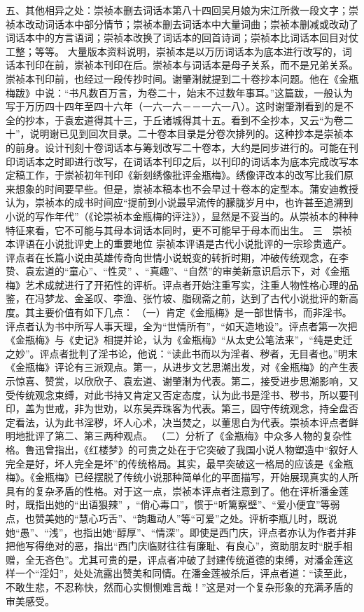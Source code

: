 \documentclass[a4paper,12pt,UTF8,twoside]{ctexbook}
\begin{document}
五、其他相异之处：崇祯本删去词话本第八十四回吴月娘为宋江所救一段文字；崇祯本改动词话本中部分情节；崇祯本删去词话本中大量词曲；崇祯本删减或改动了词话本中的方言语词；崇祯本改换了词话本的回首诗词；崇祯本比词话本回目对仗工整；等等。
大量版本资料说明，崇祯本是以万历词话本为底本进行改写的，词话本刊印在前，崇祯本刊印在后。崇祯本与词话本是母子关系，而不是兄弟关系。
崇祯本刊印前，也经过一段传抄时间。谢肇淛就提到二十卷抄本问题。他在《金瓶梅跋》中说：“书凡数百万言，为卷二十，始末不过数年事耳。”这篇跋，一般认为写于万历四十四年至四十六年（一六一六－－一六一八）。这时谢肇淛看到的是不全的抄本，于袁宏道得其十三，于丘诸城得其十五。看到不全抄本，又云“为卷二十”，说明谢已见到回次目录。二十卷本目录是分卷次排列的。这种抄本是崇祯本的前身。设计刊刻十卷词话本与筹划改写二十卷本，大约是同步进行的。可能在刊印词话本之时即进行改写，在词话本刊印之后，以刊印的词话本为底本完成改写本定稿工作，于崇祯初年刊印《新刻绣像批评金瓶梅》。绣像评改本的改写比我们原来想象的时间要早些。但是，崇祯本稿本也不会早过十卷本的定型本。蒲安迪教授认为，崇祯本的成书时间应“提前到小说最早流传的朦胧岁月中，也许甚至追溯到小说的写作年代”（《论崇祯本金瓶梅的评注》），显然是不妥当的。从崇祯本的种种特征来看，它不可能与其母本词话本同时，更不可能早于母本而出生。
三　崇祯本评语在小说批评史上的重要地位
崇祯本评语是古代小说批评的一宗珍贵遗产。评点者在长篇小说由英雄传奇向世情小说蜕变的转折时期，冲破传统观念，在李贽、袁宏道的“童心”、“性灵” 、“真趣”、“自然”的审美新意识启示下，对《金瓶梅》艺术成就进行了开拓性的评析。评点者开始注重写实，注重人物性格心理的品鉴，在冯梦龙、金圣叹、李渔、张竹坡、脂砚斋之前，达到了古代小说批评的新高度。其主要价值有如下几点：
（一）肯定《金瓶梅》是一部世情书，而非淫书。评点者认为书中所写人事天理，全为“世情所有”，“如天造地设”。评点者第一次把《金瓶梅》与《史记》相提并论，认为《金瓶梅》“从太史公笔法来”，“纯是史迁之妙”。评点者批判了淫书论，他说：“读此书而以为淫者、秽者，无目者也。”明末《金瓶梅》评论有三派观点。第一，从进步文艺思潮出发，对《金瓶梅》的产生表示惊喜、赞赏，以欣欣子、袁宏道、谢肇淛为代表。第二，接受进步思潮影响，又受传统观念束缚，对此书持又肯定又否定态度，认为此书是淫书、秽书，所以要刊印，盖为世戒，非为世劝，以东吴弄珠客为代表。第三，固守传统观念，持全盘否定看法，认为此书淫秽，坏人心术，决当焚之，以董思白为代表。崇祯本评点者鲜明地批评了第二、第三两种观点。
（二）分析了《金瓶梅》中众多人物的复杂性格。鲁迅曾指出，《红楼梦》的可贵之处在于它突破了我国小说人物塑造中“叙好人完全是好，坏人完全是坏”的传统格局。其实，最早突破这一格局的应该是《金瓶梅》。《金瓶梅》已经摆脱了传统小说那种简单化的平面描写，开始展现真实的人所具有的复杂矛盾的性格。对于这一点，崇祯本评点者注意到了。他在评析潘金莲时，既指出她的“出语狠辣” ，“俏心毒口”，惯于“听篱察壁”、“爱小便宜”等弱点，也赞美她的“慧心巧舌”、“韵趣动人”等“可爱”之处。评析李瓶儿时，既说她“愚”、“浅”，也指出她“醇厚”、“情深”。即使是西门庆，评点者亦认为作者并非把他写得绝对的恶，指出“西门庆临财往往有廉耻、有良心”，资助朋友时“脱手相赠，全无吝色”。尤其可贵的是，评点者冲破了封建传统道德的束缚，对潘金莲这样一个“淫妇”，处处流露出赞美和同情。在潘金莲被杀后，评点者道：“读至此，不敢生悲，不忍称快，然而心实恻恻难言哉！”这是对一个复杂形象的充满矛盾的审美感受。
\end{document}
